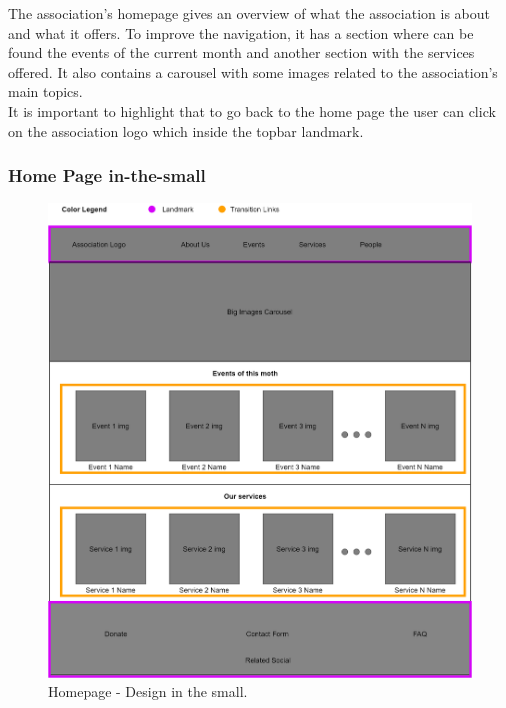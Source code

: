 The association's homepage gives an overview of what the association is about and what it offers. To improve the navigation, it has a section where can be found the events of the current month and another section with the services offered. It also contains a carousel with some images related to the association's main topics.\\
It is important to highlight that to go back to the home page the user can click on the association logo which inside the topbar landmark.

\subsubsection{Home Page in-the-small}
\begin{figure}[h!]
	\centering
	\begin{minipage}[b]{0.9\textwidth}
    		\includegraphics[width=\textwidth]{./assets/homepage.png}
		\caption{Homepage - Design in the small.}
	\end{minipage}
\end{figure}
\FloatBarrier

\clearpage


